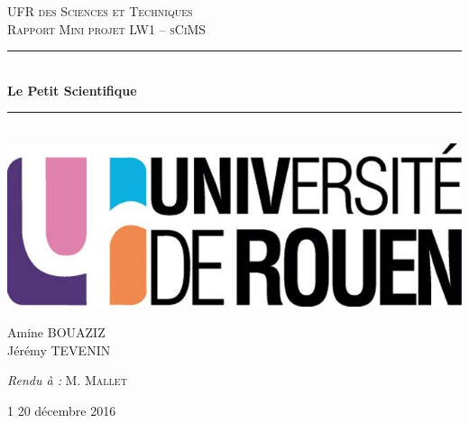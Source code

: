 \documentclass[11pt, openany]{report}
\newcommand{\HRule}{\rule{\linewidth}{0.5mm}}
\begin{document}
\begin{titlepage}
  \begin{sffamily}
  \begin{center}


    \textsc{\LARGE UFR des Sciences et Techniques}\\[2cm]

    \textsc{\Large Rapport Mini projet LW1 – sCiMS}\\[1.5cm]

    \HRule \\[0.4cm]
    { \huge \bfseries Le Petit Scientifique\\[0.4cm] }

	\HRule \\[2cm]
    \includegraphics[scale=0.2]{images/universite-rouen.jpg}
    \\[2cm]

    \begin{minipage}{0.4\textwidth}
      \begin{flushleft} \large
        Amine \textsc{BOUAZIZ}\\
        Jérémy \textsc{TEVENIN}\\
      \end{flushleft}
    \end{minipage}
    \begin{minipage}{0.4\textwidth}
      \begin{flushright} \large
        \emph{Rendu à :} M. \textsc{Mallet}\\
      \end{flushright}
    \end{minipage}

    \vfill

    {\large 1\ier{} 20 décembre 2016}

  \end{center}
  \end{sffamily}
\end{titlepage}
\end{document}
